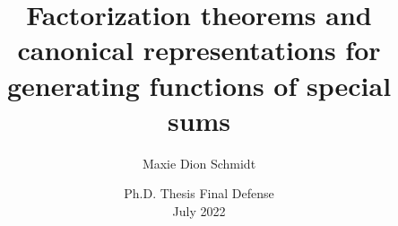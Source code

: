 \newcommand{\Iverson}[1]{\ensuremath{\left[#1\right]_{\delta}}} 

\DeclareMathOperator{\DGF}{DGF} 
\DeclareMathOperator{\ds}{ds} 
\DeclareMathOperator{\Id}{Id}
\DeclareMathOperator{\sq}{sq}

\newcommand{\ceiling}[1]{\ensuremath{\left\lceil #1 \right\rceil}} 
\newcommand{\ImportantMarker}{%
                              \textcolor{GATechGold}{\textbf{[!! \underline{IMPORTANT} !!]}}}

\newcommand{\Floor}[2]{\ensuremath{\left\lfloor \frac{#1}{#2} \right\rfloor}}
\newcommand{\Ceiling}[2]{\ensuremath{\left\lceil \frac{#1}{#2} \right\rceil}}                              

\newcommand{\gkpSI}[2]{\ensuremath{\genfrac{\lbrack}{\rbrack}{0pt}{}{#1}{#2}}} 
\newcommand{\gkpSII}[2]{\ensuremath{\genfrac{\lbrace}{\rbrace}{0pt}{}{#1}{#2}}}

\newcommand{\TitleBoxed}[1]{
     \begin{beamercolorbox}[sep=8pt,center,shadow=true,rounded=true]{title}
          \usebeamerfont{title}#1\par%
     \end{beamercolorbox}
}

\newcommand{\emphbold}[1]{\textcolor{GATechBuzzGold!50!darkgray}{\bf\emph#1}}
\newcommand{\ThesisDirectoryBase}{../../ThesisDraftWorking}



\title[Ph.D. Final Defense]{
     Factorization theorems and canonical representations for generating functions of special sums
} 

\author{Maxie Dion Schmidt} %
\date[Final Defense (Summer 2022)]{Ph.D. Thesis Final Defense \\ July 2022} %



